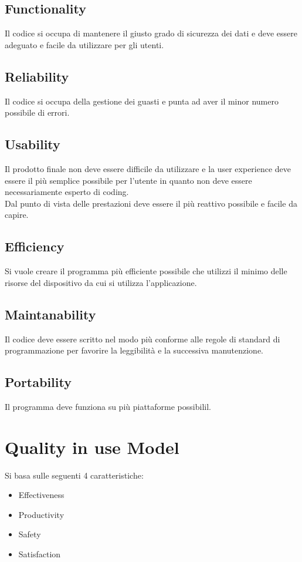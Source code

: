 \documentclass{article}
\begin{document}
\subsection{Functionality}
Il codice si occupa di mantenere il giusto grado di sicurezza dei dati e deve essere adeguato e facile
da utilizzare per gli utenti.

\subsection{Reliability}
Il codice si occupa della gestione dei guasti e punta ad aver il minor numero possibile di errori.

\subsection{Usability}
Il prodotto finale non deve essere difficile da utilizzare e la user experience deve essere il più
semplice possibile per l'utente in quanto non deve essere necessariamente esperto di coding.
\\Dal punto di vista delle prestazioni deve essere il più reattivo possibile e facile da capire.

\subsection{Efficiency}
Si vuole creare il programma più efficiente possibile che utilizzi il minimo delle risorse del dispositivo
da cui si utilizza l'applicazione.

\subsection{Maintanability}
Il codice deve essere scritto nel modo più conforme alle regole di standard di programmazione per favorire
la leggibilità e la successiva manutenzione.

\subsection{Portability}
Il programma deve funziona su più piattaforme possibilil.

\section{Quality in use Model}
Si basa sulle seguenti 4 caratteristiche:
\begin{itemize}
    \item Effectiveness
    \item Productivity
    \item Safety
    \item Satisfaction
\end{itemize}
\end{document}

